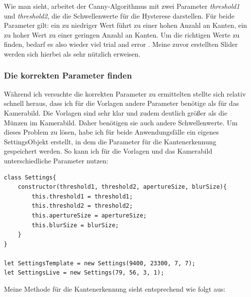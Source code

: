 Wie man sieht, arbeitet der Canny-Algorithmus mit zwei Parameter \textit{threshold1} und \textit{threshold2}, die die Schwellenwerte für die Hysterese darstellen. Für beide Parameter gilt: ein zu niedriger Wert führt zu einer hohen Anzahl an Kanten, ein zu hoher Wert zu einer geringen Anzahl an Kanten. Um die richtigen Werte zu finden, bedarf es also wieder viel \glqq trial and error\grqq{} . Meine zuvor erstellten Slider werden sich hierbei als sehr nützlich erweisen.
\subsubsection{Die korrekten Parameter finden}
Während ich versuchte die korrekten Parameter zu ermittelten stellte sich relativ schnell heraus, dass ich für die Vorlagen andere Parameter benötige als für das Kamerabild. Die Vorlagen sind sehr klar und zudem deutlich größer als die Münzen im Kamerabild. Daher benötigen sie auch andere Schwellenwerte. Um dieses Problem zu lösen, habe ich für beide Anwendungsfälle ein eigenes \glqq SettingsObjekt\grqq{} erstellt, in dem die Parameter für die Kantenerkennung gespeichert werden. So kann ich für die Vorlagen und das Kamerabild unterschiedliche Parameter nutzen:

\begin{lstlisting}[style=JavaScript]
class Settings{
    constructor(threshold1, threshold2, apertureSize, blurSize){
        this.threshold1 = threshold1;
        this.threshold2 = threshold2;
        this.apertureSize = apertureSize;
        this.blurSize = blurSize;
    }
}

let SettingsTemplate = new Settings(9400, 23300, 7, 7);
let SettingsLive = new Settings(79, 56, 3, 1);
\end{lstlisting}

Meine Methode für die Kantenerkennung sieht entsprechend wie folgt aus:

